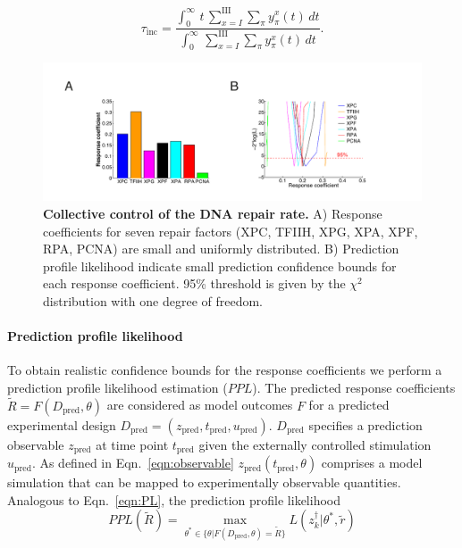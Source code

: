 \begin{equation}
\tau_{\text{inc}}=\frac{\int^\infty_0 \,t \,\sum_{x=I}^{\text{III}} \sum_ \pi  y_\pi^x(t)\,dt}{\int^\infty_0  \,\sum_{x=I}^{\text{III}} \sum_ \pi  y_\pi^x(t)\,dt}.
\end{equation}    



\begin{figure}[htbp]
	\begin{center}
		\includegraphics[width=1\textwidth]{Abbildungen/figure3_1.pdf}
		\caption{\textbf{Collective control of the DNA repair rate.} A) Response coefficients for seven repair factors (XPC, TFIIH, XPG, XPA, XPF, RPA, PCNA) are small and uniformly distributed. B) Prediction profile likelihood indicate small prediction confidence bounds for each response coefficient. 95\% threshold is given by the $\chi^{2}$ distribution with one degree of freedom.}
		\label{fig:controlCoefficients}
	\end{center}
\end{figure}

\paragraph{Prediction profile likelihood}
To obtain realistic confidence bounds for the response coefficients we perform a prediction profile likelihood estimation ($PPL$)\cite{Kreutz2012,Hinkley1979}. The predicted response coefficients $\tilde{R} = F(D_{\text{pred}},\theta)$ are considered as model outcomes $F$ for a predicted experimental design $D_{\text{pred}}= (z_{\text{pred}},t_{\text{pred}},u_{\text{pred}})$. $D_{\text{pred}}$ specifies a prediction observable $z_{\text{pred}}$ at time point $t_{\text{pred}}$ given the externally controlled stimulation $u_{\text{pred}}$. As defined in Eqn.\ \ref{eqn:observable} $z_{\text{pred}}(t_{\text{pred}},\theta)$ comprises a model simulation that can be mapped to experimentally observable quantities. Analogous to Eqn.\ \ref{eqn:PL}, the prediction profile likelihood 
\begin{equation}\label{sec:ppl}
PPL(\tilde{R}) = \max_{\theta^\ast \in \{\theta \lvert F(D_{\text{pred}},\theta)=\tilde{R}\}} L(z_k^\dag \lvert \theta^\ast,\tilde{r}) 
\end{equation}   

